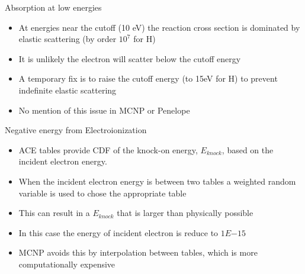 \documentclass{beamer}
\begin{document}
\begin{frame}{Absorption at low energies}

  \begin{itemize}
    \item At energies near the cutoff (10 eV) the reaction cross section is dominated by elastic scattering (by order $10^7$ for H)
    \item It is unlikely the electron will scatter below the cutoff energy 
    \item A temporary fix is to raise the cutoff energy (to 15eV for H) to prevent indefinite elastic scattering
    \item No mention of this issue in MCNP or Penelope 
  \end{itemize}

\end{frame}

\begin{frame}{Negative energy from Electroionization}
  
  \begin{itemize}
    \item ACE tables provide CDF of the knock-on energy, $E_{knock}$, based on the incident electron energy.
    \item When the incident electron energy is between two tables a weighted random variable is used to chose the appropriate table
    \item This can result in a $E_{knock}$ that is larger than physically possible
     \item In this case the energy of incident electron is reduce to $1E{-15}$
    \item MCNP avoids this by interpolation between tables, which is more computationally expensive
  \end{itemize}


\end{frame}
\end{document}

